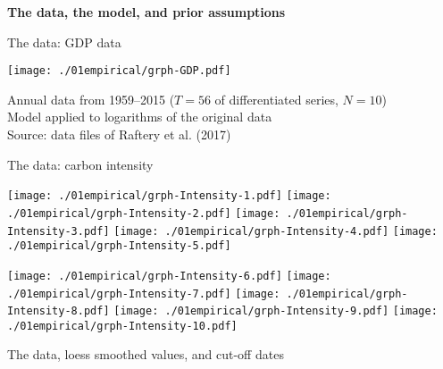 \documentclass[notes,blackandwhite,mathsans,usenames,dvipsnames]{beamer}
\begin{document}
{
\begin{frame}

\begin{adjustwidth}{-0.5cm}{0cm}
\vspace{8.3cm}\Large
\textbf{{\color{blu}The data,} {\color{gre}the model, and prior assumptions}}
\end{adjustwidth}

\end{frame}
}





\begin{frame}{The data: GDP data}

\begin{center}
\texttt{[image: ./01empirical/grph-GDP.pdf]}

\small
{\color{gre}Annual data from 1959--2015 ($T=56$ of differentiated series, $N=10$)\\
Model applied to logarithms of the original data\\
Source: data files of Raftery et al. (2017)}
\end{center}
\end{frame}



\begin{frame}{The data: carbon intensity}

\begin{center}
\begin{multicols}{2}
\texttt{[image: ./01empirical/grph-Intensity-1.pdf]}
\texttt{[image: ./01empirical/grph-Intensity-2.pdf]}
\texttt{[image: ./01empirical/grph-Intensity-3.pdf]}
\texttt{[image: ./01empirical/grph-Intensity-4.pdf]}
\texttt{[image: ./01empirical/grph-Intensity-5.pdf]}


\texttt{[image: ./01empirical/grph-Intensity-6.pdf]}
\texttt{[image: ./01empirical/grph-Intensity-7.pdf]}
\texttt{[image: ./01empirical/grph-Intensity-8.pdf]}
\texttt{[image: ./01empirical/grph-Intensity-9.pdf]}
\texttt{[image: ./01empirical/grph-Intensity-10.pdf]}

\end{multicols}
\small
{\color{gre}The data, loess smoothed values, and cut-off dates}
\end{center}
\end{frame}
\end{document}
